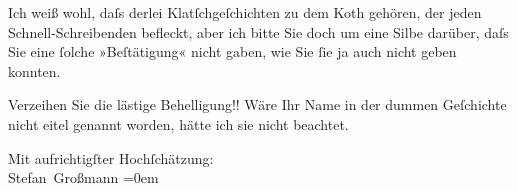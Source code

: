 \pstart
           Ich weiß wohl, daſs derlei Klatſchgeſchichten zu dem Koth gehören, der jeden
               Schnell-Schreibenden befleckt, aber ich bitte Sie doch um eine Silbe darüber, daſs
               Sie eine{ }ſolche »Beſtätigung« nicht gaben, wie Sie{ }ſie ja auch nicht geben
               konnten.\pend
           
\pstart
           Verzeihen Sie die lästige Behelligung!! Wäre Ihr Name in der dummen Geſchichte nicht
               eitel genannt worden, hätte ich sie nicht beachtet.\pend
           
\pstart
           Mit aufrichtigſter Hochſchätzung:{\\[\baselineskip]}\spacefill\mbox{Stefan Großmann}\pend
           \leftskip=0em{}\endnumbering{}  \newcommand{\dateiname}{L02005}\newcommand{\titel}{Stefan Großmann an Arthur Schnitzler, [7.] 2. 1911}\newcommand{\editorInnen}{Martin Anton Müller und Gerd-Hermann Susen}
